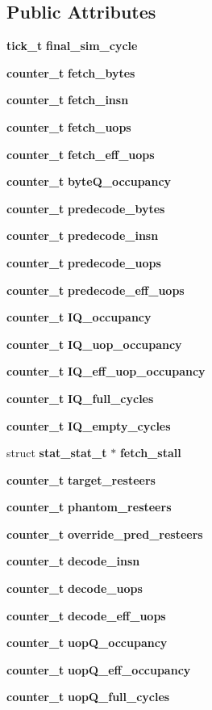 \subsection*{Public Attributes}
\begin{CompactItemize}
\item 
{\bf tick\_\-t} {\bf final\_\-sim\_\-cycle}
\item 
{\bf counter\_\-t} {\bf fetch\_\-bytes}
\item 
{\bf counter\_\-t} {\bf fetch\_\-insn}
\item 
{\bf counter\_\-t} {\bf fetch\_\-uops}
\item 
{\bf counter\_\-t} {\bf fetch\_\-eff\_\-uops}
\item 
{\bf counter\_\-t} {\bf byteQ\_\-occupancy}
\item 
{\bf counter\_\-t} {\bf predecode\_\-bytes}
\item 
{\bf counter\_\-t} {\bf predecode\_\-insn}
\item 
{\bf counter\_\-t} {\bf predecode\_\-uops}
\item 
{\bf counter\_\-t} {\bf predecode\_\-eff\_\-uops}
\item 
{\bf counter\_\-t} {\bf IQ\_\-occupancy}
\item 
{\bf counter\_\-t} {\bf IQ\_\-uop\_\-occupancy}
\item 
{\bf counter\_\-t} {\bf IQ\_\-eff\_\-uop\_\-occupancy}
\item 
{\bf counter\_\-t} {\bf IQ\_\-full\_\-cycles}
\item 
{\bf counter\_\-t} {\bf IQ\_\-empty\_\-cycles}
\item 
struct {\bf stat\_\-stat\_\-t} $\ast$ {\bf fetch\_\-stall}
\item 
{\bf counter\_\-t} {\bf target\_\-resteers}
\item 
{\bf counter\_\-t} {\bf phantom\_\-resteers}
\item 
{\bf counter\_\-t} {\bf override\_\-pred\_\-resteers}
\item 
{\bf counter\_\-t} {\bf decode\_\-insn}
\item 
{\bf counter\_\-t} {\bf decode\_\-uops}
\item 
{\bf counter\_\-t} {\bf decode\_\-eff\_\-uops}
\item 
{\bf counter\_\-t} {\bf uopQ\_\-occupancy}
\item 
{\bf counter\_\-t} {\bf uopQ\_\-eff\_\-occupancy}
\item 
{\bf counter\_\-t} {\bf uopQ\_\-full\_\-cycles}
\item 

\end{CompactItemize}
